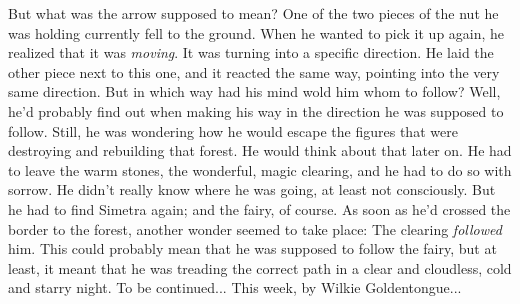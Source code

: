 But what was the arrow supposed to mean? 
One of the two pieces of the nut he was holding currently fell to the ground. When he wanted to pick it up again, he realized that it was \emph{moving}. It was turning into a specific direction. He laid the other piece next to this one, and it reacted the same way, pointing into the very same direction. But in which way had his mind wold him whom to follow? 
Well, he'd probably find out when making his way in the direction he was supposed to follow. Still, he was wondering how he would escape the figures that were destroying and rebuilding that forest. He would think about that later on. 
He had to leave the warm stones, the wonderful, magic clearing, and he had to do so with sorrow. He didn't really know where he was going, at least not consciously. But he had to find Simetra again; and the fairy, of course. 
As soon as he'd crossed the border to the forest, another wonder seemed to take place: The clearing \emph{followed} him. This could probably mean that he was supposed to follow the fairy, but at least, it meant that he was treading the correct path in a clear and cloudless, cold and starry night. 
To be continued...
This week, by Wilkie Goldentongue...
